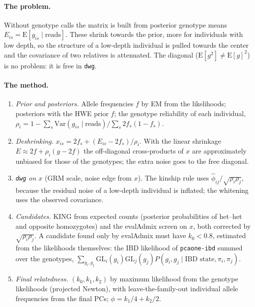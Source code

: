 \documentclass[11pt,a4paper]{article}
\begin{document}
\paragraph{The problem.} Without genotype calls the matrix is built from
posterior genotype means $E_{is}=\mathrm{E}[g_{is}\mid\text{reads}]$. These
shrink towards the prior, more for individuals with low depth, so the
structure of a low-depth individual is pulled towards the center and the
covariance of two relatives is attenuated. The diagonal ($\mathrm{E}[g^2]\ne
\mathrm{E}[g]^2$) is no problem: it is free in \texttt{dwg}.

\paragraph{The method.}
\begin{enumerate}
  \item \emph{Prior and posteriors.} Allele frequencies $f$ by EM from the
    likelihoods; posteriors with the HWE prior $f$; the genotype reliability
    of each individual,
    $\rho_i=1-\sum_s\mathrm{Var}(g_{is}\mid\text{reads})/\sum_s2f_s(1-f_s)$.
  \item \emph{Deshrinking.} $x_{is}=2f_s+(E_{is}-2f_s)/\rho_i$. With the
    linear shrinkage $E\approx2f+\rho_i(g-2f)$ the off-diagonal
    cross-products of $x$ are approximately unbiased for those of the
    genotypes; the extra noise goes to the free diagonal.
  \item \emph{\texttt{dwg} on $x$} (GRM scale, noise edge from $x$). The
    kinship rule uses $\hat\phi_{ij}/\sqrt{\rho_i\rho_j}$, because the
    residual noise of a low-depth individual is inflated; the whitening uses
    the observed covariance.
  \item \emph{Candidates.} KING from expected counts (posterior
    probabilities of het--het and opposite homozygotes) and the evalAdmix
    screen on $x$, both corrected by $\sqrt{\rho_i\rho_j}$. A candidate found
    only by evalAdmix must have $k_0<0.8$, estimated from the likelihoods
    themselves: the IBD likelihood of \texttt{pcaone-ibd} summed over the
    genotypes, $\sum_{g_i,g_j}\mathrm{GL}_i(g_i)\mathrm{GL}_j(g_j)
    P(g_i,g_j\mid\text{IBD state},\pi_i,\pi_j)$.
  \item \emph{Final relatedness.} $(k_0,k_1,k_2)$ by maximum likelihood from
    the genotype likelihoods (projected Newton), with leave-the-family-out
    individual allele frequencies from the final PCs; $\phi=k_1/4+k_2/2$.
\end{enumerate}
\end{document}

